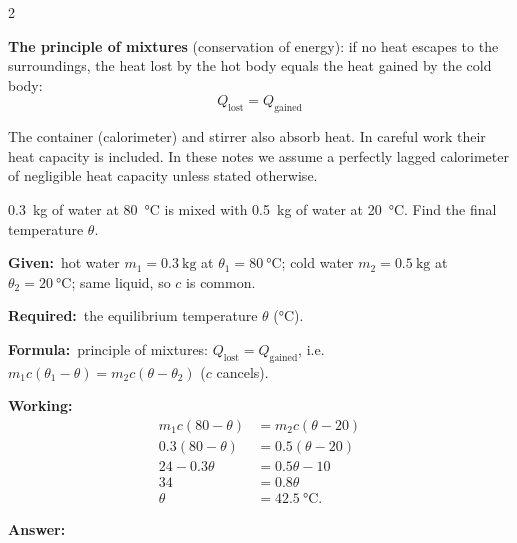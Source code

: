 \documentclass[10pt]{article}
\newcommand{\Given}{\par\vspace{2pt}\textbf{Given:}\ }
\newcommand{\Required}{\par\vspace{2pt}\textbf{Required:}\ }
\newcommand{\Formula}{\par\vspace{2pt}\textbf{Formula:}\ }
\newcommand{\Working}{\par\vspace{2pt}\textbf{Working:}}
\newcommand{\Answer}[1]{\par\vspace{2pt}\textbf{Answer:}\ \fbox{#1}}
\begin{document}
\begin{multicols}{2}
\begin{definition}
\textbf{The principle of mixtures} (conservation of energy): if no heat
escapes to the surroundings, the heat lost by the hot body equals the
heat gained by the cold body:
\[
  \boxed{\;Q_{\text{lost}} = Q_{\text{gained}}\;}
\]
\end{definition}

\begin{nb}
The container (calorimeter) and stirrer also absorb heat. In careful
work their heat capacity is included. In these notes we assume a
perfectly lagged calorimeter of negligible heat capacity unless stated
otherwise.
\end{nb}

\begin{example}
\SI{0.3}{\kilogram} of water at \SI{80}{\degreeCelsius} is mixed with
\SI{0.5}{\kilogram} of water at \SI{20}{\degreeCelsius}. Find the final
temperature $\theta$.
\tcblower
\Given hot water $m_1 = \SI{0.3}{\kilogram}$ at
$\theta_1 = \SI{80}{\degreeCelsius}$;
cold water $m_2 = \SI{0.5}{\kilogram}$ at
$\theta_2 = \SI{20}{\degreeCelsius}$; same liquid, so $c$ is common.
\Required the equilibrium temperature $\theta$ (\si{\degreeCelsius}).
\Formula principle of mixtures: $Q_{\text{lost}} = Q_{\text{gained}}$,
i.e. $m_1 c(\theta_1 - \theta) = m_2 c(\theta - \theta_2)$ ($c$ cancels).
\Working
\begin{align*}
  m_1 c (80 - \theta) &= m_2 c (\theta - 20) \\
  0.3(80 - \theta) &= 0.5(\theta - 20) \\
  24 - 0.3\theta &= 0.5\theta - 10 \\
  34 &= 0.8\theta \\
  \theta &= \SI{42.5}{\degreeCelsius}.
\end{align*}
\Answer{$\theta = \SI{42.5}{\degreeCelsius}$}
\end{example}


\end{multicols}
\end{document}
